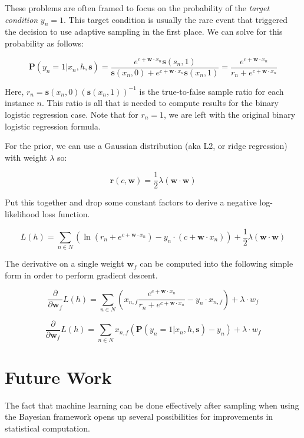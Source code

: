 \documentclass[twoside]{article}
\begin{document}
These problems are often framed to focus on the probability of the \textit{target condition} \(y_n = 1\). This target condition is usually the rare event that triggered the decision to use adaptive sampling in the first place. We can solve for this probability as follows:

\[\mathbf{P}(y_n=1|x_n,h,\mathbf{s})=\frac{e^{c+\mathbf{w} \cdot x_n}\mathbf{s}(s_n,1)}{\mathbf{s}(x_n,0)+e^{c+\mathbf{w} \cdot x_n}\mathbf{s}(x_n,1)}=\frac{e^{c+\mathbf{w} \cdot x_n}}{r_n+e^{c+\mathbf{w} \cdot x_n}} \]

Here, \(r_n = \mathbf{s}(x_n,0)(\mathbf{s}(x_n,1))^{-1}\) is the true-to-false sample ratio for each instance \(n\). This ratio is all that is needed to compute results for the binary logistic regression case. Note that for \(r_n=1\), we are left with the original binary logistic regression formula.

For the prior, we can use a Gaussian distribution (aka L2, or ridge regression) with weight \(\lambda\) so:

\[\mathbf{r}(c,\mathbf{w})=\frac{1}{2}\lambda(\mathbf{w} \cdot \mathbf{w})\]

Put this together and drop some constant factors to derive a negative log-likelihood loss function.

\[L(h)=\sum_{n \in  N} \left (\ln\left (r_n+e^{c+\mathbf{w} \cdot x_n}\right ) -y_n \cdot (c+\mathbf{w} \cdot x_n) \right )+ \frac{1}{2}\lambda(\mathbf{w} \cdot \mathbf{w})\]

The derivative on a single weight \(\mathbf{w}_f\) can be computed into the following simple form in order to perform gradient descent.

\[\frac{\partial}{\partial \mathbf{w}_f }L(h)=\sum_{n \in  N} \left(x_{n,f}\frac{e^{c+\mathbf{w} \cdot x_n}}{r_n+e^{c+\mathbf{w} \cdot x_n}} -y_n \cdot x_{n,f} \right )+ \lambda \cdot w_f\] 

\[\frac{\partial}{\partial \mathbf{w}_f }L(h)= \sum_{n \in  N} x_{n,f}\left(\mathbf{P}(y_n=1|x_n,h,\mathbf{s}) -y_n  \right )+ \lambda \cdot w_f \]

\section{Future Work}
\label{section:future_work}

The fact that machine learning can be done effectively after sampling when using the Bayesian framework opens up several possibilities for improvements in statistical computation.
\end{document}
